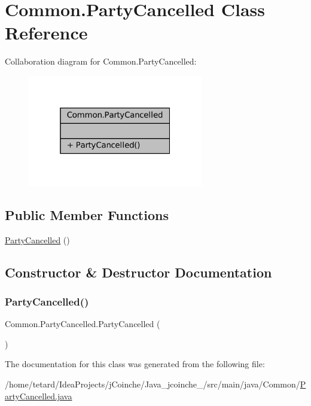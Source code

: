 \hypertarget{classCommon_1_1PartyCancelled}{}\section{Common.\+Party\+Cancelled Class Reference}
\label{classCommon_1_1PartyCancelled}


Collaboration diagram for Common.\+Party\+Cancelled\+:
\nopagebreak
\begin{figure}[H]
\begin{center}
\leavevmode
\includegraphics[width=217pt]{classCommon_1_1PartyCancelled__coll__graph}
\end{center}
\end{figure}
\subsection*{Public Member Functions}
\begin{DoxyCompactItemize}
\item 
\mbox{\hyperlink{classCommon_1_1PartyCancelled_a02a33bea3c55eac9683b6dc1f5f380b4}{Party\+Cancelled}} ()
\end{DoxyCompactItemize}


\subsection{Constructor \& Destructor Documentation}
\mbox{\label{classCommon_1_1PartyCancelled_a02a33bea3c55eac9683b6dc1f5f380b4}} 
\subsubsection{\texorpdfstring{Party\+Cancelled()}{PartyCancelled()}}
{\footnotesize\ttfamily Common.\+Party\+Cancelled.\+Party\+Cancelled (\begin{DoxyParamCaption}{ }\end{DoxyParamCaption})\hspace{0.3cm}{\ttfamily [inline]}}



The documentation for this class was generated from the following file\+:\begin{DoxyCompactItemize}
\item 
/home/tetard/\+Idea\+Projects/j\+Coinche/\+Java\+\_\+jcoinche\+\_/src/main/java/\+Common/\mbox{\hyperlink{PartyCancelled_8java}{Party\+Cancelled.\+java}}\end{DoxyCompactItemize}
